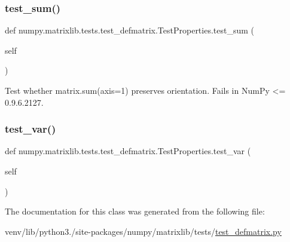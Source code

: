 \subsubsection{\texorpdfstring{test\+\_\+sum()}{test\_sum()}}
{\footnotesize\ttfamily def numpy.\+matrixlib.\+tests.\+test\+\_\+defmatrix.\+Test\+Properties.\+test\+\_\+sum (\begin{DoxyParamCaption}\item[{}]{self }\end{DoxyParamCaption})}

\begin{DoxyVerb}Test whether matrix.sum(axis=1) preserves orientation.
Fails in NumPy <= 0.9.6.2127.
\end{DoxyVerb}
 \mbox{\label{classnumpy_1_1matrixlib_1_1tests_1_1test__defmatrix_1_1TestProperties_a6b3ed5b15f2329bb8c2abb07c40c7f0a}} 
\subsubsection{\texorpdfstring{test\+\_\+var()}{test\_var()}}
{\footnotesize\ttfamily def numpy.\+matrixlib.\+tests.\+test\+\_\+defmatrix.\+Test\+Properties.\+test\+\_\+var (\begin{DoxyParamCaption}\item[{}]{self }\end{DoxyParamCaption})}



The documentation for this class was generated from the following file\+:\begin{DoxyCompactItemize}
\item 
venv/lib/python3./site-\/packages/numpy/matrixlib/tests/\hyperlink{test__defmatrix_8py}{test\+\_\+defmatrix.\+py}\end{DoxyCompactItemize}
